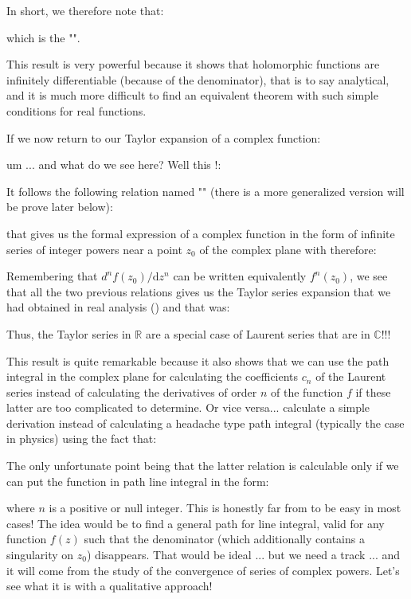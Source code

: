 	In short, we therefore note that:
	
	which is the "".
	
	This result is very powerful because it shows that holomorphic functions are infinitely differentiable (because of the denominator), that is to say analytical, and it is much more difficult to find an equivalent theorem with such simple conditions for real functions.
	
	If we now return to our Taylor expansion of a complex function:
	
	um ... and what do we see here? Well this !:
	
	It follows the following relation named "" (there is a more generalized version will be prove later below):
	
	that gives us the formal expression of a complex function in the form of infinite series of integer powers near a point $z_0$ of the complex plane with therefore:
	
	Remembering that $d^{n}f(z_0)/\mathrm{d}z^n$ can be written equivalently $f^n(z_0)$, we see that all the two previous relations gives us the Taylor series expansion that we had obtained in real analysis () and that was:
	
	Thus, the Taylor series in $\mathbb{R}$ are a special case of Laurent series that are in $\mathbb{C}$!!!
	
	This result is quite remarkable because it also shows that we can use the path integral in the complex plane for calculating the coefficients $c_n$ of the Laurent series instead of calculating the derivatives of order $n$ of the function $f$ if these latter are too complicated to determine. Or vice versa... calculate a simple derivation instead of calculating a headache type path integral (typically the case in physics) using the fact that:
	
	The only unfortunate point being that the latter relation is calculable only if we can put the function in path line integral in the form:
	
	where $n$ is a positive or null integer. This is honestly far from to be easy in most cases! The idea would be to find a general path for line integral, valid for any function $f (z)$ such that the denominator (which additionally contains a singularity on $z_0$) disappears. That would be ideal ... but we need a track ... and it will come from the study of the convergence of series of complex powers. Let's see what it is with a qualitative approach!
	

